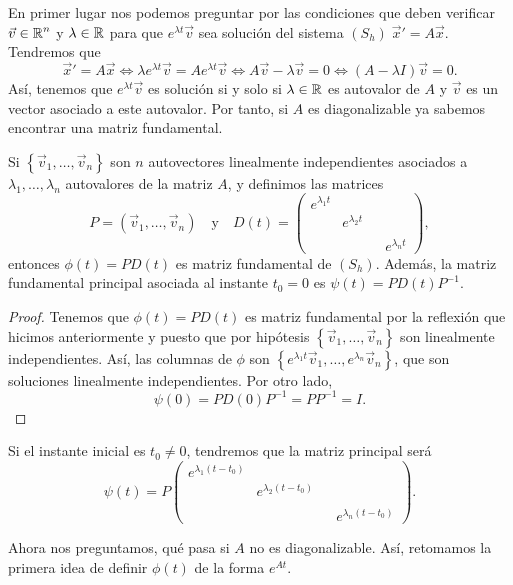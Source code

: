 En primer lugar nos podemos preguntar por las condiciones que deben verificar $\displaystyle \vec{v}\in \mathbb{R}^{n} $ y $\displaystyle \lambda \in \mathbb{R} $ para que $\displaystyle e^{\lambda t}\vec{v} $ sea solución del sistema $\displaystyle \left(S_{h}\right)\; \vec{x}'=A\vec{x} $. Tendremos que 
\[\vec{x}'=A\vec{x} \iff \lambda e^{\lambda t}\vec{v}=Ae^{\lambda t}\vec{v} \iff A\vec{v}-\lambda\vec{v}=0 \iff \left(A-\lambda I\right)\vec{v}=0 .\]
Así, tenemos que $\displaystyle e^{\lambda t}\vec{v} $ es solución si y solo si $\displaystyle \lambda \in \mathbb{R} $ es autovalor de $\displaystyle A $ y $\displaystyle \vec{v} $ es un vector asociado a este autovalor. Por tanto, si $\displaystyle A $ es diagonalizable ya sabemos encontrar una matriz fundamental.
\begin{prop}
	Si $\displaystyle \left\{ \vec{v}_{1}, \ldots, \vec{v}_{n}\right\}  $ son $\displaystyle n $ autovectores linealmente independientes asociados a $\displaystyle \lambda_{1}, \ldots, \lambda_{n} $ autovalores de la matriz $\displaystyle A $, y definimos las matrices
	\[P = \left(\vec{v}_{1}, \ldots, \vec{v}_{n}\right) \quad \text{y} \quad D\left(t\right)=\begin{pmatrix} e^{\lambda_{1}t} & & & \\
	& e^{\lambda_{2}t} & & \\
	& & & \\
	& & & e^{\lambda_{n}t}\end{pmatrix} ,\]
	entonces $\displaystyle \phi\left(t\right)=PD\left(t\right) $ es matriz fundamental de $\displaystyle \left(S_{h}\right) $. Además, la matriz fundamental principal asociada al instante $\displaystyle t_{0}=0 $ es $\displaystyle \psi\left(t\right)=PD\left(t\right)P^{-1} $.
\end{prop}
\begin{proof}
	Tenemos que $\displaystyle \phi\left(t\right)=PD\left(t\right) $ es matriz fundamental por la reflexión que hicimos anteriormente y puesto que por hipótesis $\displaystyle \left\{ \vec{v}_{1}, \ldots, \vec{v}_{n}\right\}  $ son linealmente independientes. Así, las columnas de $\displaystyle \phi $ son $\displaystyle \left\{ e^{\lambda_{1}t}\vec{v}_{1}, \ldots, e^{\lambda_{n}}\vec{v}_{n}\right\}  $, que son soluciones linealmente independientes. 
Por otro lado, 
\[\psi\left(0\right)=PD\left(0\right)P^{-1}=P P^{-1}= I .\]
\end{proof}
\begin{observation}
Si el instante inicial es $\displaystyle t_{0}\neq 0 $, tendremos que la matriz principal será
\[\psi\left(t\right)=P\begin{pmatrix} e^{\lambda_{1}\left(t-t_{0}\right)} & & & \\
	& e^{\lambda_{2}\left(t-t_{0}\right)} & & \\
	& & & \\
	& & & e^{\lambda_{n}\left(t-t_{0}\right)}\end{pmatrix} .\]
\end{observation}
Ahora nos preguntamos, qué pasa si $\displaystyle A $ no es diagonalizable. Así, retomamos la primera idea de definir $\displaystyle \phi\left(t\right) $ de la forma $\displaystyle e^{At} $. 
